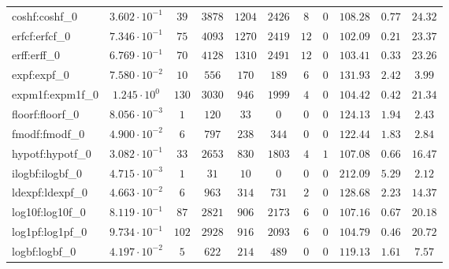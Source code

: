 \begin{tabular}{|l|c|c|c|c|c|c|c|c|c|c|}
coshf:coshf\_0               & $ 3.602 \cdot 10^{-1} $ & $ 39     $ & $ 3878  $ & $ 1204  $ & $ 2426  $ & $ 8   $ & $ 0 $ & $ 108.28      $ & $ 0.77    $ & $ 24.32   $ \\
erfcf:erfcf\_0               & $ 7.346 \cdot 10^{-1} $ & $ 75     $ & $ 4093  $ & $ 1270  $ & $ 2419  $ & $ 12  $ & $ 0 $ & $ 102.09      $ & $ 0.21    $ & $ 23.37   $ \\
erff:erff\_0                 & $ 6.769 \cdot 10^{-1} $ & $ 70     $ & $ 4128  $ & $ 1310  $ & $ 2491  $ & $ 12  $ & $ 0 $ & $ 103.41      $ & $ 0.33    $ & $ 23.26   $ \\
expf:expf\_0                 & $ 7.580 \cdot 10^{-2} $ & $ 10     $ & $ 556   $ & $ 170   $ & $ 189   $ & $ 6   $ & $ 0 $ & $ 131.93      $ & $ 2.42    $ & $ 3.99    $ \\
expm1f:expm1f\_0             & $ 1.245 \cdot 10^{0}  $ & $ 130    $ & $ 3030  $ & $ 946   $ & $ 1999  $ & $ 4   $ & $ 0 $ & $ 104.42      $ & $ 0.42    $ & $ 21.34   $ \\
floorf:floorf\_0             & $ 8.056 \cdot 10^{-3} $ & $ 1      $ & $ 120   $ & $ 33    $ & $ 0     $ & $ 0   $ & $ 0 $ & $ 124.13      $ & $ 1.94    $ & $ 2.43    $ \\
fmodf:fmodf\_0               & $ 4.900 \cdot 10^{-2} $ & $ 6      $ & $ 797   $ & $ 238   $ & $ 344   $ & $ 0   $ & $ 0 $ & $ 122.44      $ & $ 1.83    $ & $ 2.84    $ \\
hypotf:hypotf\_0             & $ 3.082 \cdot 10^{-1} $ & $ 33     $ & $ 2653  $ & $ 830   $ & $ 1803  $ & $ 4   $ & $ 1 $ & $ 107.08      $ & $ 0.66    $ & $ 16.47   $ \\
ilogbf:ilogbf\_0             & $ 4.715 \cdot 10^{-3} $ & $ 1      $ & $ 31    $ & $ 10    $ & $ 0     $ & $ 0   $ & $ 0 $ & $ 212.09      $ & $ 5.29    $ & $ 2.12    $ \\
ldexpf:ldexpf\_0             & $ 4.663 \cdot 10^{-2} $ & $ 6      $ & $ 963   $ & $ 314   $ & $ 731   $ & $ 2   $ & $ 0 $ & $ 128.68      $ & $ 2.23    $ & $ 14.37   $ \\
log10f:log10f\_0             & $ 8.119 \cdot 10^{-1} $ & $ 87     $ & $ 2821  $ & $ 906   $ & $ 2173  $ & $ 6   $ & $ 0 $ & $ 107.16      $ & $ 0.67    $ & $ 20.18   $ \\
log1pf:log1pf\_0             & $ 9.734 \cdot 10^{-1} $ & $ 102    $ & $ 2928  $ & $ 916   $ & $ 2093  $ & $ 6   $ & $ 0 $ & $ 104.79      $ & $ 0.46    $ & $ 20.72   $ \\
logbf:logbf\_0               & $ 4.197 \cdot 10^{-2} $ & $ 5      $ & $ 622   $ & $ 214   $ & $ 489   $ & $ 0   $ & $ 0 $ & $ 119.13      $ & $ 1.61    $ & $ 7.57    $ \\

\end{tabular}
